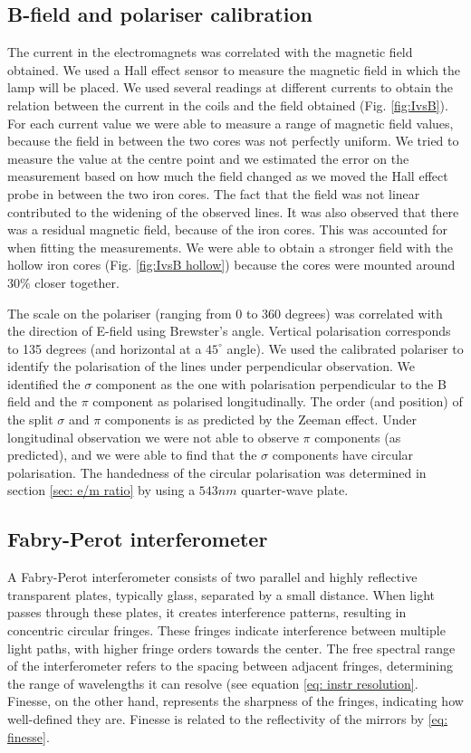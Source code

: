 \documentclass[11pt]{article}
\begin{document}
\subsection{B-field and polariser calibration}
The current in the electromagnets was correlated with the magnetic field obtained. We used a Hall effect sensor to measure the magnetic field in which the lamp will be placed. We used several readings at different currents to obtain the relation between the current in the coils and the field obtained (Fig. \ref{fig:IvsB}). For each current value we were able to measure a range of magnetic field values, because the field in between the two cores was not perfectly uniform. We tried to measure the value at the centre point and we estimated the error on the measurement based on how much the field changed as we moved the Hall effect probe in between the two iron cores. The fact that the field was not linear contributed to the widening of the observed lines. It was also observed that there was a residual magnetic field, because of the iron cores. This was accounted for when fitting the measurements. We were able to obtain a stronger field with the hollow iron cores (Fig. \ref{fig:IvsB hollow}) because the cores were mounted around $30\%$ closer together.

The scale on the polariser (ranging from 0 to 360 degrees) was correlated with the direction of E-field using Brewster's angle. Vertical polarisation corresponds to 135 degrees (and horizontal at a $45^\circ$ angle). We used the calibrated polariser to identify the polarisation of the lines under perpendicular observation. We identified the $\sigma$ component as the one with polarisation perpendicular to the B field and the $\pi$ component as polarised longitudinally. The order (and position) of the split $\sigma$ and $\pi$ components is as predicted by the Zeeman effect. Under longitudinal observation we were not able to observe $\pi$ components (as predicted), and we were able to find that the $\sigma$ components have circular polarisation. The handedness of the circular polarisation was determined in section \ref{sec: e/m ratio} by using a $543 \si{nm}$ quarter-wave plate. 

\subsection{Fabry-Perot interferometer}
A Fabry-Perot interferometer consists of two parallel and highly reflective transparent plates, typically glass, separated by a small distance. When light passes through these plates, it creates interference patterns, resulting in concentric circular fringes. These fringes indicate interference between multiple light paths, with higher fringe orders towards the center. The free spectral range of the interferometer refers to the spacing between adjacent fringes, determining the range of wavelengths it can resolve (see equation \eqref{eq: instr resolution}. 
Finesse, on the other hand, represents the sharpness of the fringes, indicating how well-defined they are. Finesse is related to the reflectivity of the mirrors by \eqref{eq: finesse}. 
\end{document}
